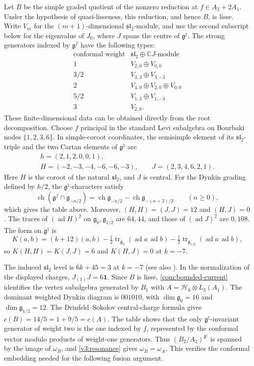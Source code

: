 \documentclass[11pt,a4paper]{amsart}
\numberwithin{equation}{section}
\theoremstyle{definition}
\theoremstyle{remark}
\newcommand{\C}{\mathbb C}
\newcommand{\g}{\mathfrak g}
\newcommand{\slg}{\mathfrak{sl}}
\newcommand{\ch}{\operatorname{ch}}
\newcommand{\tr}{\operatorname{tr}}
\newcommand{\ad}{\operatorname{ad}}
\begin{document}
Let $B$ be the simple graded quotient of the nonzero reduction at
$f\in A_2+2A_1$. Under the hypothesis of quasi-lisseness, this reduction,
and hence $B$, is lisse. Write $V_m$ for the $(m+1)$-dimensional
$\slg_2$-module, and use the second subscript below for the eigenvalue
of $J_0$, where $J$ spans the centre of $\g^\natural$. The strong generators
indexed by $\g^f$ have the following types:
$$
\begin{array}{c|l}
\text{conformal weight}&\slg_2\oplus\C J\text{-module}\\\hline
1&V_{2,0}\oplus V_{0,0}\\
3/2&V_{3,3}\oplus V_{3,-3}\\
2&V_{4,0}\oplus V_{2,0}\oplus V_{0,0}\\
5/2&V_{1,3}\oplus V_{1,-3}\\
3&V_{2,0}.
\end{array}
$$
These finite-dimensional data can be obtained directly from the
root decomposition. Choose $f$ principal in the standard Levi subalgebra
on Bourbaki nodes $\{1,2,3,6\}$. In simple-coroot coordinates, the
semisimple element of its $\slg_2$-triple and the two Cartan elements
of $\g^\natural$ are
$$
 \begin{gathered}
 h=(2,1,2,0,0,1),\\
 H=(-2,-3,-4,-6,-6,-3),\qquad J=(2,3,4,6,2,1).
 \end{gathered}
$$
Here $H$ is the coroot of the natural $\slg_2$, and $J$ is central.
For the Dynkin grading defined by $h/2$, the $\g^\natural$-characters
satisfy
$$
 \ch(\g^f\cap\g_{-n/2})
   =\ch\g_{-n/2}-\ch\g_{-(n+2)/2}\qquad(n\ge0),
$$
which gives the table above. Moreover, $(H,H)=(J,J)=12$ and
$(H,J)=0$. The traces of $(\ad H)^2$ on $\g_0,\g_{1/2}$ are
$64,44$, and those of $(\ad J)^2$ are $0,108$. The form on $\g^\natural$ is
$$
 K(a,b)=(k+12)(a,b)
 -\tfrac12\tr_{\g_0}(\ad a\,\ad b)
 -\tfrac12\tr_{\g_{1/2}}(\ad a\,\ad b),
$$
so $K(H,H)=K(J,J)=6$ and $K(H,J)=0$ at $k=-7$.

The induced $\slg_2$ level is $6k+45=3$ at $k=-7$
(see also \cite[Table~13]{AVEMSlodowy2024}). In the normalization of the
displayed charges, $J_{(1)}J=6\mathbf1$. Since $B$ is lisse,
\cref{com:bounded-current} identifies the vertex subalgebra generated by $B_1$ with
$A=\mathcal H_6\otimes L_3(A_1)$.
The dominant weighted Dynkin diagram is $001010$, with
$\dim\g_0=16$ and $\dim\g_{1/2}=12$. The Drinfeld--Sokolov central-charge
formula gives $c(B)=14/5=1+9/5=c(A)$. The table shows that
the only $\g^\natural$-invariant generator of weight two is the one
indexed by $f$, represented by the conformal vector modulo products of weight-one generators. Thus $(B_2/A_2)^{\g^\natural}$ is spanned by the image of $\omega_B$,
and \cref{v3:resonance} gives
$\omega_B=\omega_A$. This verifies the conformal embedding needed
for the following fusion argument.
\end{document}
